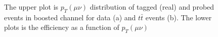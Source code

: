 \begin{figure}[ht]
	\begin{center}
		\caption{The upper plot is $p_{T}(\mu\nu)$ distribution of tagged (real) and probed events in boosted channel for data (a) and $t\bar{t}$ events (b). The lower plots is the efficiency as a function of $p_{T}(\mu\nu)$}
		\label{Fig:eff_met_merged}
	\end{center}
\end{figure}


